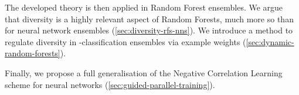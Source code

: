 \documentclass[
	twoside=false, %
]{kaobook}
\begin{document}
The developed theory is then applied in Random Forest ensembles. We argue that diversity is a highly relevant aspect of Random Forests, much more so than for neural network ensembles (\cf \cref{sec:diversity-rfs-nns}). We introduce a method to regulate diversity in \zeroone-classification ensembles via example weights (\cf \cref{sec:dynamic-random-forests}).

Finally, we propose a full generalisation of the Negative Correlation Learning scheme for neural networks (\cf \cref{sec:guided-parallel-training}).













\end{document}

